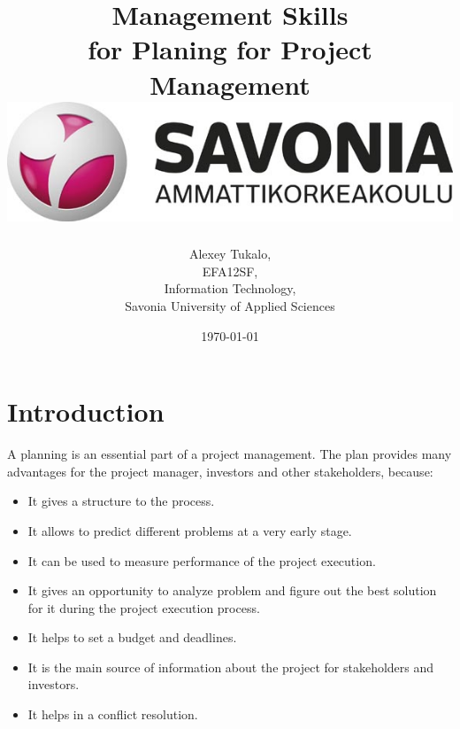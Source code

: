 \documentclass[english]{article}
\date{}
\begin{document}
\title{\vspace{2in}Management Skills\\
\small for Planing for Project Management\\
\vspace{0.5in}\includegraphics{savonia.jpg}}

\nopagebreak
\maketitle


\vspace{3in}

\author{
\begin{flushright}
Alexey Tukalo,\\
EFA12SF,\\
Information Technology,\\
Savonia University of Applied Sciences
\end{flushright}
}

\date{\today}
\thispagestyle{empty}

\newpage
\setcounter{page}{1}
\setcounter{tocdepth}{2}
\tableofcontents

\newpage


\section{Introduction}

A planning is an essential part of a project management. The plan provides many advantages for the project manager, investors and other stakeholders, because:

\begin{itemize}
\item It gives a structure to the process.
\item It allows to predict different problems at a very early stage.
\item It can be used to measure performance of the project execution.
\item It gives an opportunity to analyze problem and figure out the best solution for it during the project execution process.
\item It helps to set a budget and deadlines.
\item It is the main source of information about the project for stakeholders and investors.
\item It helps in a conflict resolution.
\end{itemize}
\end{document}
